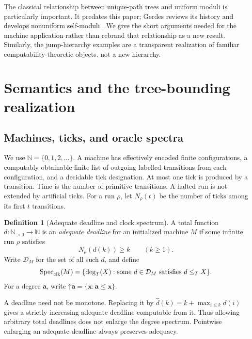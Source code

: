 \documentclass[11pt,letterpaper]{article}
\theoremstyle{definition}
\newtheorem{definition}[theorem]{Definition}
\theoremstyle{remark}
\newcommand{\N}{\mathbb N}
\newcommand{\1}{\mathbf 1}
\newcommand{\csdegT}{\operatorname{deg}_{T}}
\newcommand{\csSpec}{\operatorname{Spec}_{\rm clk}}
\newcommand{\csClock}{\mathcal D}
\newcommand{\csCone}[1]{\mathord{\uparrow}\!#1}
\newcommand{\srctag}[1]{\texorpdfstring{\hspace{0.4em}{\normalfont\small\color{accent}[source #1]}}{ [source #1]}}
\begin{document}
The classical relationship between unique-path trees and uniform moduli
is particularly important. It predates this paper; Gerdes reviews its
history and develops nonuniform self-moduli \cite{cs-gerdes}. We give the
short arguments needed for the machine application rather than rebrand
that relationship as a new result. Similarly, the jump-hierarchy examples
are a transparent realization of familiar computability-theoretic objects,
not a new hierarchy.

\section{Semantics and the tree-bounding realization\srctag{12}}\label{lbh:cs:sec:realization}

\subsection{Machines, ticks, and oracle spectra}
We use $\N=\{0,1,2,\ldots\}$. A machine has effectively encoded finite
configurations, a computably obtainable finite list of outgoing labelled
transitions from each configuration, and a decidable tick designation.
At most one tick is produced by a transition. Time is the number of
primitive transitions. A halted run is not extended by artificial ticks.
For a run $\rho$, let $N_\rho(t)$ be the number of ticks among its first
$t$ transitions.

\begin{definition}[Adequate deadline and clock spectrum]
A total function $d:\N_{>0}\to\N$ is an \emph{adequate deadline} for an
initialized machine $M$ if some infinite run $\rho$ satisfies
\begin{equation}\label{lbh:cs:eq:clock}
 N_\rho(d(k))\geq k\qquad(k\geq1).
\end{equation}
Write $\csClock_M$ for the set of all such $d$, and define
\begin{equation}\label{lbh:cs:eq:spec}
 \csSpec(M)=\{\csdegT(X):\text{some }d\in\csClock_M\text{ satisfies }d\leq_T X\}.
\end{equation}
For a degree $\mathbf a$, write
$\csCone{\mathbf a}=\{\mathbf x:\mathbf a\leq\mathbf x\}$.
\end{definition}

A deadline need not be monotone. Replacing it by
$\widehat d(k)=k+\max_{i\leq k}d(i)$ gives a strictly increasing adequate
deadline computable from it. Thus allowing arbitrary total deadlines does
not enlarge the degree spectrum. Pointwise enlarging an adequate deadline
always preserves adequacy.
\end{document}
